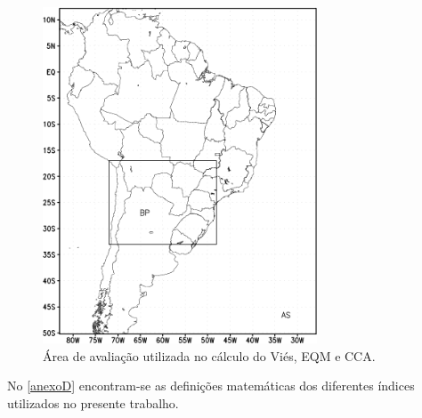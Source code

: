 \begin{figure}[!h]
\centering
\includegraphics[height=10cm]{./figs/area_aval.png}
\caption{Área de avaliação utilizada no cálculo do Viés, EQM e CCA.}
\label{fig09}
\end{figure}

No \autoref{anexoD} encontram-se as definições matemáticas dos diferentes índices utilizados no presente trabalho.
